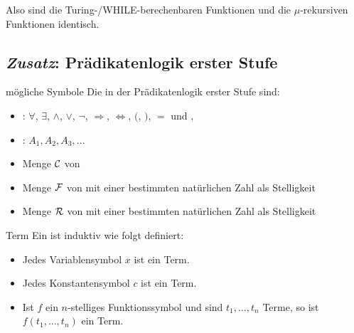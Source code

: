 \begin{Bem}
    Also sind die Turing-/WHILE-berechenbaren Funktionen und die $\mu$-rekursiven Funktionen
    identisch.
\end{Bem}

\pagebreak

\subsection{%
    \emph{Zusatz}:
    Prädikatenlogik erster Stufe%
}

\begin{Def}{mögliche Symbole}
    Die in der Prädikatenlogik erster Stufe  sind:
    \begin{itemize}
        \item
        : $\forall$, $\exists$, $\land$, $\lor$, $\lnot$, $\Rightarrow$,
        $\Leftrightarrow$, $($, $)$, $=$ und $,$

        \item
        : $A_1, A_2, A_3, \dotsc$

        \item
        Menge $\mathcal{C}$ von 

        \item
        Menge $\mathcal{F}$ von 
        mit einer bestimmten natürlichen Zahl als Stelligkeit

        \item
        Menge $\mathcal{R}$ von 
        mit einer bestimmten natürlichen Zahl als Stelligkeit
    \end{itemize}
\end{Def}

\linie

\begin{Def}{Term}
    Ein  ist induktiv wie folgt definiert:
    \begin{itemize}
        \item
        Jedes Variablensymbol $x$ ist ein Term.

        \item
        Jedes Konstantensymbol $c$ ist ein Term.

        \item
        Ist $f$ ein $n$-stelliges Funktionssymbol und sind $t_1, \dotsc, t_n$
        Terme, so ist $f(t_1, \dotsc, t_n)$ ein Term.
    \end{itemize}
\end{Def}

